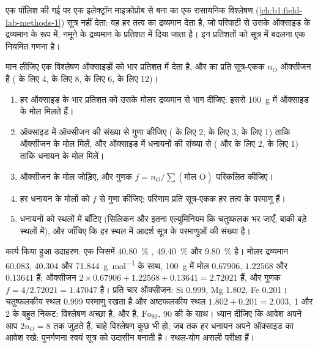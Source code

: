 एक पॉलिश की गई  पर एक इलेक्ट्रॉन माइक्रोप्रोब से बना  का एक रासायनिक विश्लेषण (\cref{ch:b1:field-lab-methods-1})
सूत्र नहीं देता: वह हर तत्व का द्रव्यमान देता है, जो परिपाटी से उसके ऑक्साइड के द्रव्यमान के रूप में, नमूने के द्रव्यमान
के प्रतिशत में दिया जाता है। इन प्रतिशतों को सूत्र में बदलना एक नियमित गणना है।

\begin{method}[स्थिर ऑक्सीजन संख्या पर विश्लेषण की पुनर्गणना]\label{met:b1:rock-forming-minerals:recalculation}
मान लीजिए एक विश्लेषण ऑक्साइडों को भार प्रतिशत में देता है, और  का प्रति सूत्र-एकक $n_O$ ऑक्सीजन है (
के लिए 4,  के लिए 8,  के लिए 6,  के लिए 12)।
\begin{enumerate}
  \item हर ऑक्साइड के भार प्रतिशत को उसके मोलर द्रव्यमान से भाग दीजिए: इससे \qty{100}{g}  में ऑक्साइड के मोल मिलते हैं।
  \item ऑक्साइड में ऑक्सीजन की संख्या से गुणा कीजिए ( के लिए 2,  के लिए 3,  के लिए 1) ताकि
        ऑक्सीजन के मोल मिलें, और ऑक्साइड में धनायनों की संख्या से ( और  के लिए 2,  के लिए 1)
        ताकि धनायन के मोल मिलें।
  \item ऑक्सीजन के मोल जोड़िए, और गुणक $f = n_O / \sum(\text{मोल O})$ परिकलित कीजिए।
  \item हर धनायन के मोलों को $f$ से गुणा कीजिए: परिणाम प्रति सूत्र-एकक हर तत्व के परमाणु हैं।
  \item धनायनों को स्थलों में बाँटिए (सिलिकन और इतना एल्युमिनियम कि चतुष्फलक भर जाएँ, बाकी बड़े स्थलों में), और जाँचिए कि
        हर स्थल में आदर्श सूत्र के परमाणुओं की संख्या है।
\end{enumerate}
\end{method}

कार्य किया हुआ उदाहरण: एक  जिसमें \qty{40.80}{\percent} , \qty{49.40}{\percent}  और
\qty{9.80}{\percent}  है। मोलर द्रव्यमान \num{60.083}, \num{40.304} और \qty{71.844}{g.mol^{-1}} के साथ,
\qty{100}{g} में मोल $0.67906$, $1.22568$ और $0.13641$ हैं; ऑक्सीजन $2\times0.67906 + 1.22568 + 0.13641 = 2.72021$ हैं,
और गुणक $f = 4/2.72021 = 1.47047$ है। प्रति चार ऑक्सीजन: Si \num{0.999}, Mg \num{1.802}, Fe \num{0.201}। चतुष्फलकीय स्थल
\num{0.999} परमाणु रखता है और अष्टफलकीय स्थल $1.802 + 0.201 = 2.003$, 1 और 2 के बहुत निकट: विश्लेषण अच्छा है, और 
 है, $\text{Fo}_{90}$, 90 की  के साथ। ध्यान दीजिए कि आवेश अपने आप $2n_O = 8$ तक
जुड़ते हैं, चाहे विश्लेषण कुछ भी हो, जब तक हर धनायन अपने ऑक्साइड का आवेश रखे: पुनर्गणना स्वयं सूत्र को उदासीन
बनाती है। स्थल-योग असली परीक्षा हैं।

